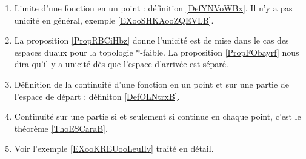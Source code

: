    \label{THEMEooGVCCooHBrNNd}

\begin{enumerate}
    \item
        Limite d'une fonction en un point : définition \ref{DefYNVoWBx}. Il n'y a pas unicité en général, exemple \ref{EXooSHKAooZQEVLB}.
    \item
        La proposition \ref{PropRBCiHbz} donne l'unicité est de mise dans le cas des espaces duaux pour la topologie \( *\)-faible. La proposition \ref{PropFObayrf} nous dira qu'il y a unicité dès que l'espace d'arrivée est séparé.
    \item
        Définition de la continuité d'une fonction en un point et sur une partie de l'espace de départ : définiton \ref{DefOLNtrxB}.
    \item
        Continuité sur une partie si et seulement si continue en chaque point, c'est le théorème \ref{ThoESCaraB}.
    \item
        Voir l'exemple \ref{EXooKREUooLeuIlv} traité en détail.
\end{enumerate}
